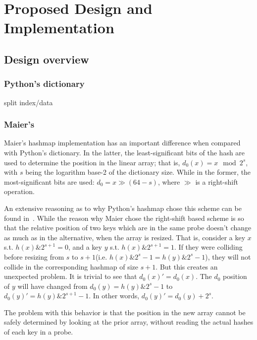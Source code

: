 \chapter{Proposed Design and Implementation}

\cite{cereggii}
\cite{peniocereus-greggii}

\section{Design overview}

\subsection{Python's dictionary}

split index/data


\subsection{Maier's}

Maier's hashmap implementation has an important difference when compared with Python's dictionary.
In the latter, the least-significant bits of the hash are used to determine the position in the linear array; that is, $d_0(x) = x \mod 2^s$, with $s$ being the logarithm base-2 of the dictionary size.
While in the former, the most-significant bits are used: $d_0 = x \gg (64 - s)$, where $\gg$ is a right-shift operation.

An extensive reasoning as to why Python's hashmap chose this scheme can be found in~\cite{dict-comment-hash}.
While the reason why Maier chose the right-shift based scheme is so that the relative position of two keys which are in the same probe doesn't change as much as in the alternative, when the array is resized.
That is, consider a key $x$ s.t. $h(x) \mathbin{\&} 2^{s+1} = 0$, and a key $y$ s.t. $h(x) \mathbin{\&} 2^{s+1} = 1$.
If they were colliding before resizing from $s$ to $s+1$(i.e. $h(x) \mathbin{\&} 2^s-1 = h(y) \mathbin{\&} 2^s-1$), they will not collide in the corresponding hashmap of size $s+1$.
But this creates an unexpected problem.
It is trivial to see that $d_0(x)' = d_0(x)$.
The $d_0$ position of $y$ will have changed from $d_0(y) = h(y) \mathbin{\&} 2^s-1$ to $d_0(y)' = h(y) \mathbin{\&} 2^{s+1}-1$.
In other words, $d_0(y)' = d_0(y) + 2^s$.

The problem with this behavior is that the position in the new array cannot be safely determined by looking at the prior array, without reading the actual hashes of each key in a probe.


